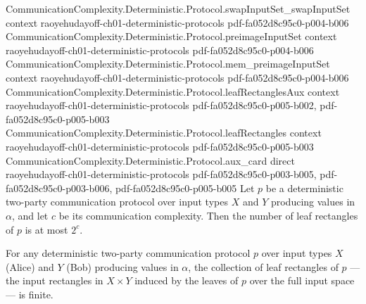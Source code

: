 \begin{lemma}
\proofstep
  {CommunicationComplexity.Deterministic.Protocol.swapInputSet_swapInputSet}
  {context}
  {raoyehudayoff-ch01-deterministic-protocols}
  {pdf-fa052d8c95c0-p004-b006}
\proofstep
  {CommunicationComplexity.Deterministic.Protocol.preimageInputSet}
  {context}
  {raoyehudayoff-ch01-deterministic-protocols}
  {pdf-fa052d8c95c0-p004-b006}
\proofstep
  {CommunicationComplexity.Deterministic.Protocol.mem_preimageInputSet}
  {context}
  {raoyehudayoff-ch01-deterministic-protocols}
  {pdf-fa052d8c95c0-p004-b006}
\proofstep
  {CommunicationComplexity.Deterministic.Protocol.leafRectanglesAux}
  {context}
  {raoyehudayoff-ch01-deterministic-protocols}
  {pdf-fa052d8c95c0-p005-b002,
    pdf-fa052d8c95c0-p005-b003}
\proofstep
  {CommunicationComplexity.Deterministic.Protocol.leafRectangles}
  {context}
  {raoyehudayoff-ch01-deterministic-protocols}
  {pdf-fa052d8c95c0-p005-b003}
\proofstep
  {CommunicationComplexity.Deterministic.Protocol.aux_card}
  {direct}
  {raoyehudayoff-ch01-deterministic-protocols}
  {pdf-fa052d8c95c0-p003-b005,
    pdf-fa052d8c95c0-p003-b006,
    pdf-fa052d8c95c0-p005-b005}
Let $p$ be a deterministic two-party communication protocol over input types $X$ and $Y$
producing values in $\alpha$, and let $c$ be its communication complexity. Then the
number of leaf rectangles of $p$ is at most $2^{c}$.
\end{lemma}

\begin{lemma}
\label{CommunicationComplexity.Deterministic.Protocol.leafRectangles_finite}
\leanok
{}
For any deterministic two-party communication protocol $p$ over input types $X$ (Alice)
and $Y$ (Bob) producing values in $\alpha$, the collection of leaf rectangles of $p$ —
the input rectangles in $X \times Y$ induced by the leaves of $p$ over the full input
space — is finite.
\end{lemma}

